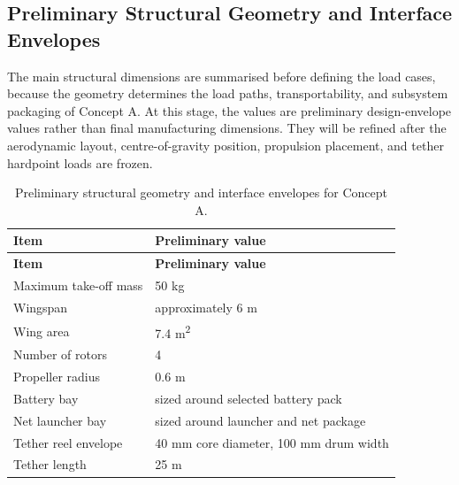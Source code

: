 \subsection{Preliminary Structural Geometry and Interface Envelopes}

The main structural dimensions are summarised before defining the load cases, because the geometry determines the load paths, transportability, and subsystem packaging of Concept A. At this stage, the values are preliminary design-envelope values rather than final manufacturing dimensions. They will be refined after the aerodynamic layout, centre-of-gravity position, propulsion placement, and tether hardpoint loads are frozen.

{
\small
\renewcommand{\arraystretch}{1}
\setlength{\tabcolsep}{5pt}
\setlength{\LTleft}{0pt}
\setlength{\LTright}{0pt}

\begin{longtable}{@{}p{}p{}@{}}
\caption{Preliminary structural geometry and interface envelopes for Concept A.}
\label{tab:concept_a_structural_geometry} \\
\toprule
\textbf{Item} & \textbf{Preliminary value} \\
\midrule
\endfirsthead

\toprule
\textbf{Item} & \textbf{Preliminary value} \\
\midrule
\endhead

\bottomrule
\endfoot

Maximum take-off mass 
& 50 kg \\

Wingspan 
& approximately 6 m \\

Wing area 
& 7.4 m\textsuperscript{2} \\

Number of rotors 
& 4 \\

Propeller radius 
& 0.6 m \\


Battery bay 
& sized around selected battery pack \\

Net launcher bay 
& sized around launcher and net package \\

Tether reel envelope 
& 40 mm core diameter, 100 mm drum width \\

Tether length 
& 25 m \\


\bottomrule
\end{longtable}
}

